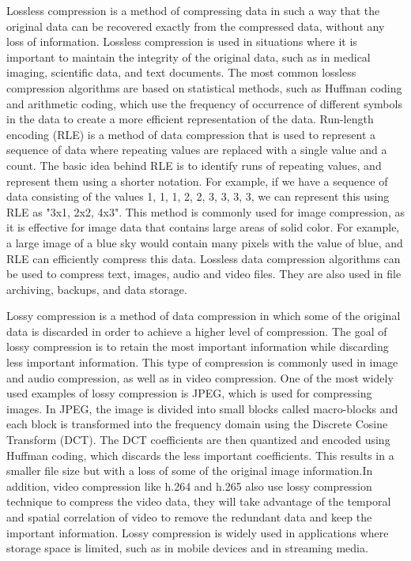 Lossless compression is a method of compressing data in such a way that the original data can be recovered exactly from the compressed data, without any loss of information. Lossless compression is used in situations where it is important to maintain the integrity of the original data, such as in medical imaging, scientific data, and text documents. The most common lossless compression algorithms are based on statistical methods, such as Huffman coding and arithmetic coding, which use the frequency of occurrence of different symbols in the data to create a more efficient representation of the data. Run-length encoding (RLE) is a method of data compression that is used to represent a sequence of data where repeating values are replaced with a single value and a count. The basic idea behind RLE is to identify runs of repeating values, and represent them using a shorter notation. For example, if we have a sequence of data consisting of the values 1, 1, 1, 2, 2, 3, 3, 3, 3, we can represent this using RLE as "3x1, 2x2, 4x3". This method is commonly used for image compression, as it is effective for image data that contains large areas of solid color. For example, a large image of a blue sky would contain many pixels with the value of blue, and RLE can efficiently compress this data. Lossless data compression algorithms can be used to compress text, images, audio and video files. They are also used in file archiving, backups, and data storage.


Lossy compression is a method of data compression in which some of the original data is discarded in order to achieve a higher level of compression. The goal of lossy compression is to retain the most important information while discarding less important information. This type of compression is commonly used in image and audio compression, as well as in video compression. One of the most widely used examples of lossy compression is JPEG, which is used for compressing images. In JPEG, the image is divided into small blocks called macro-blocks and each block is transformed into the frequency domain using the Discrete Cosine Transform (DCT). The DCT coefficients are then quantized and encoded using Huffman coding, which discards the less important coefficients. This results in a smaller file size but with a loss of some of the original image information.In addition, video compression like h.264 and h.265 also use lossy compression technique to compress the video data, they will take advantage of the temporal and spatial correlation of video to remove the redundant data and keep the important information. Lossy compression is widely used in applications where storage space is limited, such as in mobile devices and in streaming media. 

